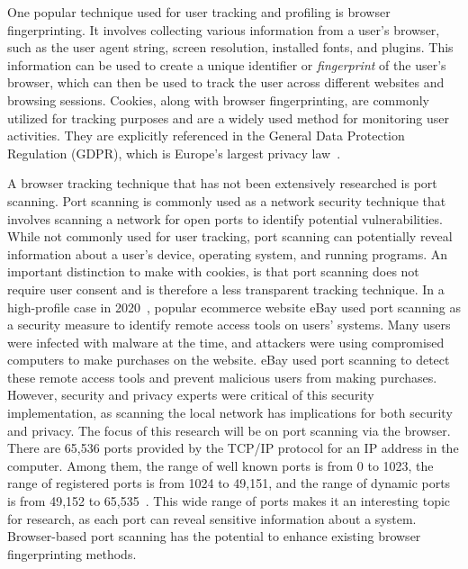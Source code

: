 One popular technique used for user tracking and profiling is browser fingerprinting. It involves collecting various information from a user's browser, such as the user agent string, screen resolution, installed fonts, and plugins. This information can be used to create a unique identifier or \emph{fingerprint} of the user's browser, which can then be used to track the user across different websites and browsing sessions. Cookies, along with browser fingerprinting, are commonly utilized for tracking purposes and are a widely used method for monitoring user activities. They are explicitly referenced in the General Data Protection Regulation (GDPR), which is Europe's largest privacy law~.

A browser tracking technique that has not been extensively researched is port scanning. Port scanning is commonly used as a network security technique that involves scanning a network for open ports to identify potential vulnerabilities. While not commonly used for user tracking, port scanning can potentially reveal information about a user's device, operating system, and running programs. An important distinction to make with cookies, is that port scanning does not require user consent and is therefore a less transparent tracking technique.
In a high-profile case in 2020~, popular ecommerce website eBay used port scanning as a security measure to identify remote access tools on users' systems. Many users were infected with malware at the time, and attackers were using compromised computers to make purchases on the website. eBay used port scanning to detect these remote access tools and prevent malicious users from making purchases. However, security and privacy experts were critical of this security implementation, as scanning the local network has implications for both security and privacy.
The focus of this research will be on port scanning via the browser. There are 65,536 ports provided by the TCP/IP protocol for an IP address in the computer. Among them, the range of well known ports is from 0 to 1023, the range of registered ports is from 1024 to 49,151, and the range of dynamic ports is from 49,152 to 65,535~.
This wide range of ports makes it an interesting topic for research, as each port can reveal sensitive information about a system. Browser-based port scanning has the potential to enhance existing browser fingerprinting methods.


